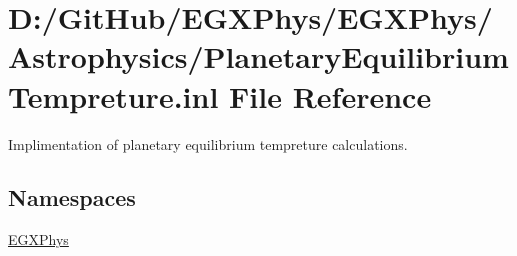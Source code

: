 \hypertarget{_planetary_equilibrium_tempreture_8inl}{}\section{D\+:/\+Git\+Hub/\+E\+G\+X\+Phys/\+E\+G\+X\+Phys/\+Astrophysics/\+Planetary\+Equilibrium\+Tempreture.inl File Reference}
\label{_planetary_equilibrium_tempreture_8inl}


Implimentation of planetary equilibrium tempreture calculations.  


\subsection*{Namespaces}
\begin{DoxyCompactItemize}
\item 
 \mbox{\hyperlink{namespace_e_g_x_phys}{E\+G\+X\+Phys}}
\end{DoxyCompactItemize}
